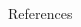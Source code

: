 \documentclass[final,hyperref={pdfpagelabels=true}]{beamer}
\newenvironment{postit}
{\begin{beamercolorbox}[sep=1em,wd=7cm]{postit}}
{\end{beamercolorbox}}
\begin{document}
\begin{frame}
\begin{columns}[t]
\begin{column}{.45\textwidth}
\begin{block}{References}
\begin{thebibliography}{999}
        \end{thebibliography}
      \end{block}
    \end{column}
  \end{columns}

  
\end{frame}
\end{document}
